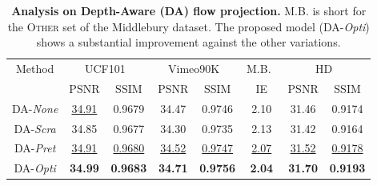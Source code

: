 \documentclass[10pt,twocolumn,letterpaper]{article}
\def\red#1{\textcolor{MyRed}{#1}}
\def\blue#1{\textcolor{MyBlue}{#1}}
\def\first#1{\red{\textbf{#1}}}
\def\second#1{\blue{\underline{#1}}}
\begin{document}
	\begin{table}
	\caption{
		\textbf{Analysis on Depth-Aware (DA) flow projection.} 
M.B. is short for the \textsc{Other} set of the Middlebury dataset.
The proposed model (DA-\textit{Opti}) shows a substantial improvement against the other variations.
	}
	\vspace{-1mm}
	\label{tab:depth-aware_ablation}
	\footnotesize
	\renewcommand{\tabcolsep}{3pt} \centering
	\begin{tabular}{cccccccc}
		\toprule
		\multirow{2}{*}[-0.28em]{Method} &  
		\multicolumn{2}{c}{UCF101~\cite{soomro2012ucf101}} &
		\multicolumn{2}{c}{Vimeo90K~\cite{xue2017video}} &
		M.B.~\cite{baker2011database} &
		\multicolumn{2}{c}{HD~\cite{bao2018MEMC-Net}}\\
\cmidrule(l{2pt}r{1pt}){2-3}
		\cmidrule(l{2pt}r{1pt}){4-5} 
		\cmidrule(l{2pt}r{1pt}){6-6}
		\cmidrule(l{2pt}r{1pt}){7-8}
		
&PSNR & SSIM 	&PSNR & SSIM	& 
		IE & PSNR & SSIM \\
		\midrule
DA-\textit{{None}}	 &\second{34.91}  &0.9679   &34.47 &0.9746 & 2.10 & 31.46 & 0.9174 \\

		DA-\textit{{Scra}} &34.85  &  0.9677 & 34.30 &0.9735 & 2.13& 31.42 & 0.9164\\

		DA-\textit{{Pret}} & \second{34.91} & \second{0.9680}  & \second{34.52} & \second{0.9747} & \second{2.07} & \second{31.52} & \second{0.9178}\\		
	
	 	DA-\textit{{Opti}} &\first{34.99}  &  \first{0.9683} & \first{34.71} &\first{0.9756} &\first{2.04} &\first{31.70} & \first{0.9193}\\
		\bottomrule
	\end{tabular}
		\vspace{-10pt} 	
\end{table}
\end{document}
